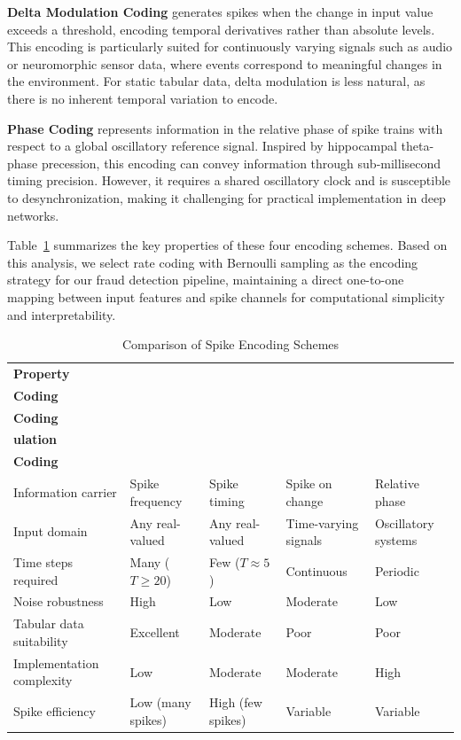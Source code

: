 \textbf{Delta Modulation Coding} generates spikes when the change in input value exceeds a threshold, encoding temporal derivatives rather than absolute levels. This encoding is particularly suited for continuously varying signals such as audio or neuromorphic sensor data, where events correspond to meaningful changes in the environment. For static tabular data, delta modulation is less natural, as there is no inherent temporal variation to encode.

\textbf{Phase Coding} represents information in the relative phase of spike trains with respect to a global oscillatory reference signal. Inspired by hippocampal theta-phase precession, this encoding can convey information through sub-millisecond timing precision. However, it requires a shared oscillatory clock and is susceptible to desynchronization, making it challenging for practical implementation in deep networks.

Table~\ref{tab:snn-encoding-comparison} summarizes the key properties of these four encoding schemes. Based on this analysis, we select rate coding with Bernoulli sampling as the encoding strategy for our fraud detection pipeline, maintaining a direct one-to-one mapping between input features and spike channels for computational simplicity and interpretability.

\begin{table}[H]
\centering
\caption{Comparison of Spike Encoding Schemes}
\label{tab:snn-encoding-comparison}
\small
\begingroup
\setlength{\tabcolsep}{3pt}
\renewcommand{\arraystretch}{1.12}
\begin{tabularx}{\textwidth}{>{\RaggedRight\arraybackslash}p{3.2cm}XXXX}
\toprule
\textbf{Property} & \makecell{\textbf{Rate}\\\textbf{Coding}} & \makecell{\textbf{Latency}\\\textbf{Coding}} & \makecell{\textbf{Delta Mod}\\\textbf{ulation}} & \makecell{\textbf{Phase}\\\textbf{Coding}} \\
\midrule
Information carrier & Spike frequency & Spike timing & Spike on change & Relative phase \\
Input domain & Any real-valued & Any real-valued & Time-varying signals & Oscillatory systems \\
Time steps required & Many ($T \geq 20$) & Few ($T \approx 5$) & Continuous & Periodic \\
Noise robustness & High & Low & Moderate & Low \\
Tabular data suitability & Excellent & Moderate & Poor & Poor \\
Implementation complexity & Low & Moderate & Moderate & High \\
Spike efficiency & Low (many spikes) & High (few spikes) & Variable & Variable \\
\bottomrule
\end{tabularx}
\endgroup
\end{table}

